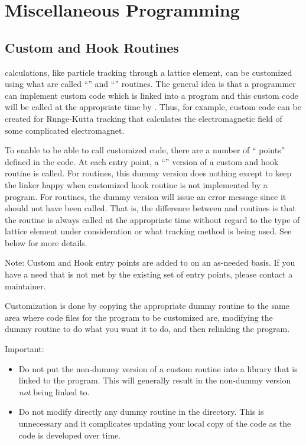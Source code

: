 \chapter{Miscellaneous Programming}

\section{Custom and Hook Routines}
\label{s:custom.hook}

\bmad calculations, like particle tracking through a lattice element, can be customized
using what are called ``'' and ``'' routines. The general idea is that
a programmer can implement custom code which is linked into a program and this custom code
will be called at the appropriate time by \bmad. Thus, for example, custom code can be
created for Runge-Kutta tracking that calculates the electromagnetic field of some
complicated electromagnet.

To enable \bmad to be able to call customized code, there are a number of ``
points'' defined in the \bmad code. At each entry point, a ``'' version of a
custom and hook routine is called. For  routines, this dummy version does nothing
except to keep the linker happy when customized hook routine is not implemented by a
program. For  routines, the dummy version will issue an error message since it
should not have been called. That is, the difference between  and 
routines is that the  routine is always called at the appropriate time without
regard to the type of lattice element under consideration or what tracking method is being
used. See below for more details.

Note: Custom and Hook entry points are added to \bmad on an as-needed basis. If you have a
need that is not met by the existing set of entry points, please contact a \bmad
maintainer.

Customization is done by copying the appropriate dummy routine to the same
area where code files for the program to be customized are, modifying the dummy routine to
do what you want it to do, and then relinking the program.

Important: 
\begin{itemize}
\item
Do not put the non-dummy version of a custom routine into a library that is linked to the
program. This will generally result in the non-dummy version {\em not} being linked to.
\item
Do not modify directly any dummy routine in the  directory. This is unnecessary
and it complicates updating your local copy of the \bmad code as the \bmad code is
developed over time.
\end{itemize}

